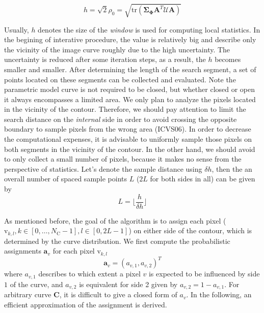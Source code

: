 \begin{equation}
  \label{eq:radius}
  h = \sqrt{2} \rho_0 = \sqrt{\mathrm{tr}(\mathbf{\Sigma}_{\mathbf{\Phi}}\mathbf{A}^T\mathcal{U}\mathbf{A})}
\end{equation}

Usually, $h$ denotes the size of the \textit{window} is used for computing
local statistics. In the begining of interative procedure, the value
is relatively big and describe only the vicinity of the image curve
roughly due to the high uncertainty. The
uncertainty is reduced after some iteration steps, as a result, the $h$ becomes smaller and
smaller. After determining the length of the search segment, 
a set of points located on these segments can be collected and
evaluated. Note the parametric model curve is not required to be
closed, but whether closed or open it always encompasses a limited area. We only plan to
analyze the pixels located in the vicinity of the contour. Therefore,
we should pay attention to limit the search distance on the
\textit{internal} side in order to avoid crossing the opposite
boundary to sample pixels from the wrong area (ICVS06). In order to
decrease the computational expenses, it is advisable to uniformly sample those
pixels on both segments in the vicinity of the contour. In the other
hand, we should avoid to only collect a small number of pixels, because
it makes no sense from the perspective of statistics. Let's denote the
sample distance using $\delta h$, then the an overall number of spaced
sample points $L$ ($2L$ for both sides in all) can be given by 
\begin{equation}
  \label{eq:sample}
  L = \lfloor \frac{h}{\delta h} \rfloor
\end{equation}

As mentioned before, the goal of the algorithm is to assign each pixel
($\mathrm{v}_{k,l}, k \in [0,\ldots,N_{\mathrm{C}}-1], l \in [0,
2L-1]$) on either side of the contour, which is determined by the
curve distribution. We first compute the probabilistic
assignments $\mathbf{a}_{v}$ for each pixel $\mathrm{v}_{k,l}$
\begin{equation}
  \label{eq:pa}
  \mathbf{a}_v  = (a_{v,1}, a_{v,2})^T
\end{equation}
where $a_{v,1}$ describes to which extent a pixel $v$ is expected to
be influenced by side $1$ of the curve, and $a_{v,2}$ is equivalent
for side 2 given by $a_{v,2} = 1- a_{v,1}$. For arbitrary curve
$\mathbf{C}$, it is difficult to give a closed form of $a_v$. In the
following, an efficient approximation of the assignment is derived.


